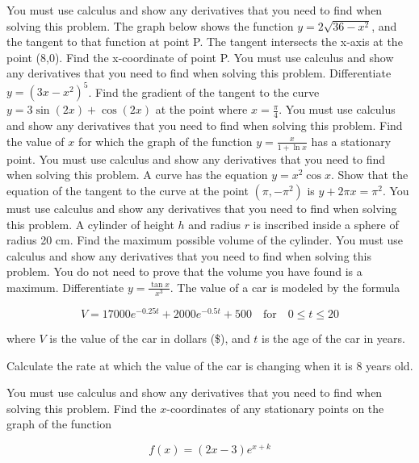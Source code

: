 \documentclass[12pt,addpoints]{exam}
\begin{document}
\begin{questions}
You must use calculus and show any derivatives that you need to find when solving this problem.
\fillwithlines{5cm}
\question[5] The graph below shows the function \( y = 2\sqrt{36 - x^2} \), and the tangent to that function at point P. The tangent intersects the x-axis at the point (8,0). Find the x-coordinate of point P. You must use calculus and show any derivatives that you need to find when solving this problem.
\fillwithlines{5cm}
\question[5] Differentiate \( y = (3x - x^2)^5 \).
\fillwithlines{5cm}
\question[5] Find the gradient of the tangent to the curve \( y = 3\sin(2x) + \cos(2x) \) at the point where \( x = \frac{\pi}{4} \). You must use calculus and show any derivatives that you need to find when solving this problem.
\fillwithlines{5cm}
\question[5] Find the value of \( x \) for which the graph of the function \( y = \frac{x}{1 + \ln x} \) has a stationary point. You must use calculus and show any derivatives that you need to find when solving this problem.
\fillwithlines{5cm}
\question[5] A curve has the equation \( y = x^2 \cos x \). Show that the equation of the tangent to the curve at the point \( \left( \pi, -\pi^2 \right) \) is \( y + 2\pi x = \pi^2 \). You must use calculus and show any derivatives that you need to find when solving this problem.
\fillwithlines{5cm}
\question[5] A cylinder of height \( h \) and radius \( r \) is inscribed inside a sphere of radius 20 cm. Find the maximum possible volume of the cylinder. You must use calculus and show any derivatives that you need to find when solving this problem. You do not need to prove that the volume you have found is a maximum.
\fillwithlines{5cm}
\question[5] Differentiate \( y = \frac{\tan x}{x^3} \).
\fillwithlines{5cm}
\question[5] The value of a car is modeled by the formula

\[ V = 17000 e^{-0.25t} + 2000 e^{-0.5t} + 500 \quad \text{for} \quad 0 \leq t \leq 20 \]

where \( V \) is the value of the car in dollars (\$), and \( t \) is the age of the car in years.

Calculate the rate at which the value of the car is changing when it is 8 years old.

You must use calculus and show any derivatives that you need to find when solving this problem.
\fillwithlines{5cm}
\question[5] Find the \( x \)-coordinates of any stationary points on the graph of the function

\[ f(x) = (2x - 3)e^{x+k} \]


\end{questions}
\end{document}
